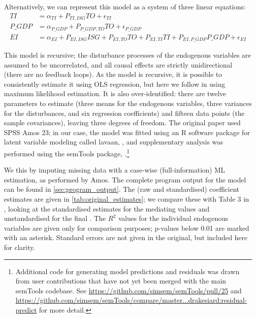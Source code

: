 \documentclass[11pt,a4paper]{article}
\newcommand{\pkg}[1]{{\fontseries{b}\selectfont #1}}
\begin{document}
Alternatively, we can represent this model as a system of three linear equations:
\begin{align}
TI &= \alpha_{TI} + P_{TI,ISG} TO + \epsilon_{TI} \label{eq:ti}\\
P\_GDP &= \alpha_{P\_GDP} + P_{P\_GDP,TO} TO + \epsilon_{P\_GDP} \label{eq:pgdp}\\
EI &= \alpha_{EI} + P_{EI,ISG} ISG + P_{EI,TO} TO + P_{EI,TI} TI + P_{EI,P\_GDP} P\_GDP + \epsilon_{EI} \label{eq:ei}
\end{align}

This model is recursive; the disturbance processes of the endogenous variables are assumed to be uncorrelated, and all causal effects are strictly unidirectional (there are no feedback loops).
As the model is recursive, it is possible to consistently estimate it using OLS regression, but here we follow \cite{panHowIndustrializationTrade2019} in using maximum likelihood estimation.
It is also over-identified: there are twelve parameters to estimate (three means for the endogenous variables, three variances for the disturbances, and six regression coefficients) and fifteen data points (the sample covariances), leaving three degrees of freedom.
The original paper used SPSS Amos 23; in our case, the model was fitted using an R software package for latent variable modeling called \pkg{lavaan}, \cite{rosseelLavaanPackageStructural2012}, and supplementary analysis was performed using the \pkg{semTools} package, \cite{jorgensenSemToolsUsefulTools2019}.\footnote{
Additional code for generating model predictions and residuals was drawn from user contributions that have not yet been merged with the main \pkg{semTools} codebase.
See \url{https://github.com/simsem/semTools/pull/25} and \url{https://github.com/simsem/semTools/compare/master...drakesiard:residual-predict} for more detail.
}

We this by imputing missing data with a case-wise (full-information) ML estimation, as performed by Amos. 
The complete program output for the model can be found in \cref{sec:program_output}.
The (raw and standardised) coefficient estimates are given in \cref{tab:original_estimates}; we compare these with Table 3 in \cite{panHowIndustrializationTrade2019}, looking at the standardised estimates for the mediating values and unstandardised for the final .
The $R^{2}$ values for the individual endogenous variables are given only for comparison purposes; p-values below 0.01 are marked with an asterisk.
Standard errors are not given in the original, but included here for clarity.
\end{document}
